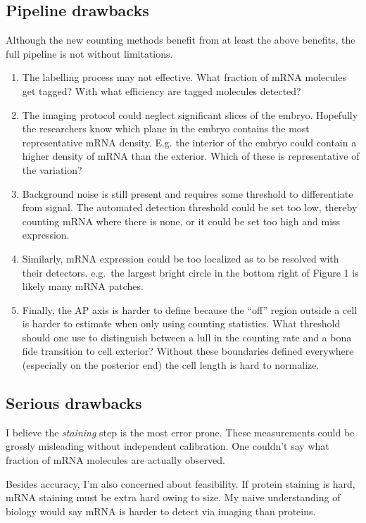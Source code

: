 \documentclass{article}
\begin{document}
    \subsection{Pipeline drawbacks}
    Although the new counting methods benefit from at least the above benefits, the full pipeline is not without limitations. 
    \begin{enumerate}
        \item The labelling process may not effective.  What fraction of mRNA molecules get tagged? With what efficiency are tagged molecules detected?
        \item The imaging protocol could neglect significant slices of the embryo. Hopefully the researchers know which plane in the embryo contains the most representative mRNA density. E.g. the interior of the embryo could contain a higher density of mRNA than the exterior. Which of these is representative of the variation? 
        \item Background noise is still present and requires some threshold to differentiate from signal. The automated detection threshold could be set too low, thereby counting mRNA where there is none, or it could be set too high and miss expression.
        \item Similarly, mRNA expression could be too localized as to be resolved with their detectors. e.g.\ the largest bright circle in the bottom right of Figure 1 is likely many mRNA patches. 
        \item Finally, the AP axis is harder to define because the ``off'' region outside a cell is harder to estimate when only using counting statistics. What threshold should one use to distinguish between a lull in the counting rate and a bona fide transition to cell exterior? Without these boundaries defined everywhere (especially on the posterior end) the cell length is hard to normalize.
    \end{enumerate}

    \subsection{Serious drawbacks}
    I believe the \textit{staining} step is the most error prone. These measurements could be grossly misleading without independent calibration. One couldn't say what fraction of mRNA molecules are actually observed. 
    
    
    Besides accuracy, I'm also concerned about feasibility. If protein staining is hard, mRNA staining must be extra hard owing to size. My naive understanding of biology would say mRNA is harder to detect via imaging than proteins. 
    
\end{document}
